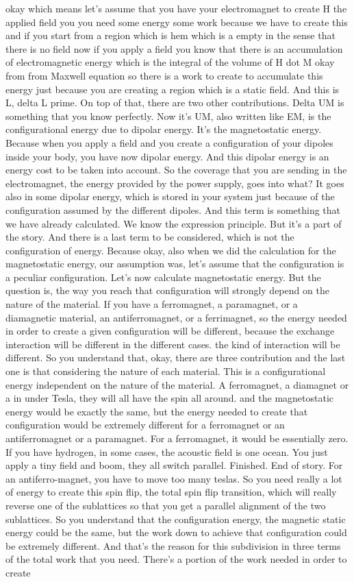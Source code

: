 okay which means let's assume that you have your electromagnet to create H the applied field you you need some energy some work because we have to create this and if you start from a region which is hem which is a empty in the sense that there is no field now if you apply a field you know that there is an accumulation of electromagnetic energy which is the integral of the volume of H dot M okay from from Maxwell equation so there is a work to create to accumulate this energy just because you are creating a region which is a static field. And this is L, delta L prime. On top of that, there are two other contributions. Delta UM is something that you know perfectly. Now it's UM, also written like EM, is the configurational energy due to dipolar energy. It's the magnetostatic energy. Because when you apply a field and you create a configuration of your dipoles inside your body, you have now dipolar energy. And this dipolar energy is an energy cost to be taken into account. So the coverage that you are sending in the electromagnet, the energy provided by the power supply, goes into what? It goes also in some dipolar energy, which is stored in your system just because of the configuration assumed by the different dipoles. And this term is something that we have already calculated. We know the expression principle. But it's a part of the story. And there is a last term to be considered, which is not the configuration of energy. Because okay, also when we did the calculation for the magnetostatic energy, our assumption was, let's assume that the configuration is a peculiar configuration. Let's now calculate magnetostatic energy. But the question is, the way you reach that configuration will strongly depend on the nature of the material. If you have a ferromagnet, a paramagnet, or a diamagnetic material, an antiferromagnet, or a ferrimagnet, so the energy needed in order to create a given configuration will be different, because the exchange interaction will be different in the different cases. the kind of interaction will be different. So you understand that, okay, there are three contribution and the last one is that considering the nature of each material. This is a configurational energy independent on the nature of the material. A ferromagnet, a diamagnet or a in under Tesla, they will all have the spin all around. and the magnetostatic energy would be exactly the same, but the energy needed to create that configuration would be extremely different for a ferromagnet or an antiferromagnet or a paramagnet. For a ferromagnet, it would be essentially zero. If you have hydrogen, in some cases, the acoustic field is one ocean. You just apply a tiny field and boom, they all switch parallel. Finished. End of story. For an antiferro-magnet, you have to move too many teslas. So you need really a lot of energy to create this spin flip, the total spin flip transition, which will really reverse one of the sublattices so that you get a parallel alignment of the two sublattices. So you understand that the configuration energy, the magnetic static energy could be the same, but the work down to achieve that configuration could be extremely different. And that's the reason for this subdivision in three terms of the total work that you need. There's a portion of the work needed in order to create 